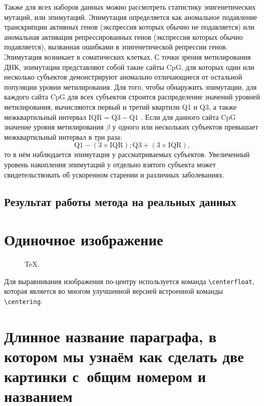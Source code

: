 Также для всех наборов данных можно рассмотреть статистику эпигенетических мутаций, или эпимутаций. Эпимутация определяется как аномальное подавление транскрипции активных генов (экспрессия которых обычно не подавляется) или аномальная активация репрессированных генов (экспрессия которых обычно подавляется), вызванная ошибками в эпигенетической репрессии генов. Эпимутация возникает в соматических клетках. С точки зрения метилирования ДНК, эпимутации представляют собой такие сайты CpG, для которых один или несколько субъектов демонстрируют аномально отличающиеся от остальной популяции уровни метилирования. Для того, чтобы обнаружить эпимутации, для каждого сайта CpG для всех субъектов строится распределение значений уровней метилирования, вычисляются первый и третий квартили Q1 и Q3, а также межквартильный интервал $\text{IQR} = \text{Q3} - \text{Q1}$ \autocite{Gentilini2015}. Если для данного сайта CpG значение уровня метилирования $\beta$ у одного или нескольких субъектов превышает межквартильный интервал в три раза:
\begin{equation}
\label{eq:iqr}
\text{Q1} - (3 \times \text{IQR}); \text{Q3} + (3 \times \text{IQR}), 
\end{equation}
то в нём наблюдается эпимутация у рассматриваемых субъектов. Увеличенный уровень накопления эпимутаций у отдельно взятого субъекта может свидетельствовать об ускоренном старении и различных заболеваниях.

\subsection{Результат работы метода на реальных данных}\label{subsec:ch2/sec2/subsec2}





\section{Одиночное изображение}\label{sec:ch2/sec12}

\begin{figure}[ht]
  \caption{TeX.}\label{fig:latex}
\end{figure}

Для выравнивания изображения по-центру используется команда \verb+\centerfloat+, которая является во
многом улучшенной версией встроенной команды \verb+\centering+.

\section{Длинное название параграфа, в котором мы узнаём как сделать две картинки с~общим номером и названием}\label{sec:ch2/sect2}

